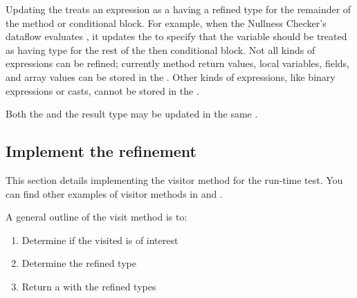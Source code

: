 Updating the  treats an expression as a
having a refined type for the remainder of the method or conditional block. For
example, when the Nullness Checker's dataflow evaluates , it
updates the  to specify that the variable
 should be treated as having type  for the rest of the
then conditional block.  Not all kinds of expressions can be refined; currently
method return values, local variables, fields, and array values can be stored in
the .  Other kinds of expressions, like
binary expressions or casts, cannot be stored in the
.

Both the  and the result type may be updated
in the same .

\subsection{Implement the refinement\label{dataflow-implement-refinement}}

This section details implementing the visitor method
 for the 
run-time test.  You can find other examples of visitor methods in
 and
.

A general outline of the visit method is to:
\begin{enumerate}
\item Determine if the visited  is of interest
\item Determine the refined type
\item Return a  with the refined
    types
\end{enumerate}


